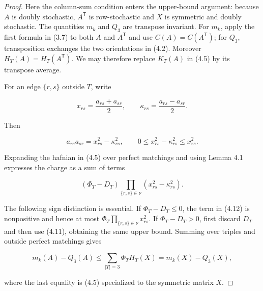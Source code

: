 \documentclass[10pt,a4paper]{amsart}
\begin{document}
\begin{proof}
Here the column-sum condition enters the upper-bound argument:
because $A$ is doubly stochastic, $A^{\mathsf T}$ is row-stochastic and
$X$ is symmetric and doubly stochastic. The quantities $m_k$ and $Q_3$ are
transpose invariant. For $m_k$, apply the first formula in (3.7) to both
$A$ and $A^{\mathsf T}$ and use $C(A)=C(A^{\mathsf T})$; for $Q_3$,
transposition exchanges the two orientations in (4.2). Moreover
$H_T(A)=H_T(A^{\mathsf T})$. We may therefore replace $K_T(A)$ in (4.5)
by its transpose average.

For an edge $\{r,s\}$ outside $T$, write

\[
x_{rs}=\frac{a_{rs}+a_{sr}}2,
\qquad
\kappa_{rs}=\frac{a_{rs}-a_{sr}}2.
\]

Then

\[
a_{rs}a_{sr}=x_{rs}^2-\kappa_{rs}^2,
\qquad
0\le x_{rs}^2-\kappa_{rs}^2\le x_{rs}^2.
\tag{4.11}
\]

Expanding the hafnian in (4.5) over perfect matchings and using Lemma 4.1
expresses the charge as a sum of terms

\[
(\Phi_T-D_T)
\prod_{\{r,s\}\in\nu}(x_{rs}^2-\kappa_{rs}^2).
\tag{4.12}
\]

The following sign distinction is essential. If $\Phi_T-D_T\le0$, the term
in (4.12) is nonpositive and hence at most
$\Phi_T\prod_{\{r,s\}\in\nu}x_{rs}^2$. If $\Phi_T-D_T>0$, first discard
$D_T$ and then use (4.11), obtaining the same upper bound. Summing over
triples and outside perfect matchings gives

\[
m_k(A)-Q_3(A)
\le\sum_{|T|=3}\Phi_T H_T(X)
=m_k(X)-Q_3(X),
\]

where the last equality is (4.5) specialized to the symmetric matrix $X$.
\end{proof}
\end{document}

